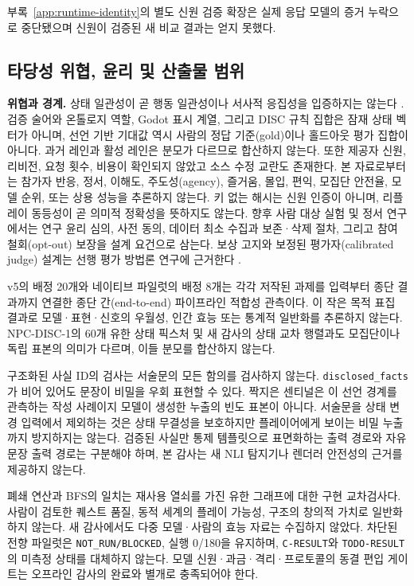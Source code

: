 \documentclass[journal]{IEEEtran}
\begin{document}
부록~\ref{app:runtime-identity}의 별도 신원 검증 확장은 실제 응답 모델의 증거 누락으로 중단됐으며 신원이 검증된 새 비교 결과는 얻지 못했다.

\subsection{타당성 위협, 윤리 및 산출물 범위}
\textbf{위협과 경계.} 상태 일관성이 곧 행동 일관성이나 서사적 응집성을 입증하지는 않는다 \cite{S55_huang2026beyond}. 검증 술어와 온톨로지 역할, Godot 표시 계열, 그리고 DISC 규칙 집합은 잠재 상태 벡터가 아니며, 선언 기반 기대값 역시 사람의 정답 기준(gold)이나 홀드아웃 평가 집합이 아니다. 과거 레인과 활성 레인은 분모가 다르므로 합산하지 않는다. 또한 제공자 신원, 리비전, 요청 횟수, 비용이 확인되지 않았고 소스 수정 교란도 존재한다. 본 자료로부터는 참가자 반응, 정서, 이해도, 주도성(agency), 즐거움, 몰입, 편익, 모집단 안전율, 모델 순위, 또는 상용 성능을 추론하지 않는다. 키 없는 해시는 신원 인증이 아니며, 리플레이 동등성이 곧 의미적 정확성을 뜻하지도 않는다. 향후 사람 대상 실험 및 정서 연구에서는 연구 윤리 심의, 사전 동의, 데이터 최소 수집과 보존·삭제 절차, 그리고 참여 철회(opt-out) 보장을 설계 요건으로 삼는다. 보상 고지와 보정된 평가자(calibrated judge) 설계는 선행 평가 방법론 연구에 근거한다 \cite{S27_vanderlee2019best,S28_karpinska2021perils,S29_zheng2023judging,S30_chen2024judgement}.

v5의 배정 20개와 네이티브 파일럿의 배정 8개는 각각 저작된 과제를 입력부터 종단 결과까지 연결한 종단 간(end-to-end) 파이프라인 적합성 관측이다. 이 작은 목적 표집 결과로 모델·표현·신호의 우월성, 인간 효능 또는 통계적 일반화를 추론하지 않는다. NPC-DISC-1의 60개 유한 상태 픽스처 및 새 감사의 상태 교차 행렬과도 모집단이나 독립 표본의 의미가 다르며, 이들 분모를 합산하지 않는다.

구조화된 사실 ID의 검사는 서술문의 모든 함의를 검사하지 않는다. \texttt{disclosed\_facts}가 비어 있어도 문장이 비밀을 우회 표현할 수 있다. 짝지은 센티널은 이 선언 경계를 관측하는 작성 사례이지 모델이 생성한 누출의 빈도 표본이 아니다. 서술문을 상태 변경 입력에서 제외하는 것은 상태 무결성을 보호하지만 플레이어에게 보이는 비밀 누출까지 방지하지는 않는다. 검증된 사실만 통제 템플릿으로 표면화하는 출력 경로와 자유 문장 출력 경로는 구분해야 하며, 본 감사는 새 NLI 탐지기나 렌더러 안전성의 근거를 제공하지 않는다.

폐쇄 연산과 BFS의 일치는 재사용 열쇠를 가진 유한 그래프에 대한 구현 교차검사다. 사람이 검토한 퀘스트 품질, 동적 세계의 플레이 가능성, 구조의 창의적 가치로 일반화하지 않는다. 새 감사에서도 다중 모델·사람의 효능 자료는 수집하지 않았다. 차단된 전향 파일럿은 \texttt{NOT\_RUN/BLOCKED}, 실행 0/180을 유지하며, \texttt{C-RESULT}와 \texttt{TODO-RESULT}의 미측정 상태를 대체하지 않는다. 모델 신원·과금·격리·프로토콜의 동결 편입 게이트는 오프라인 감사의 완료와 별개로 충족되어야 한다.
\end{document}
